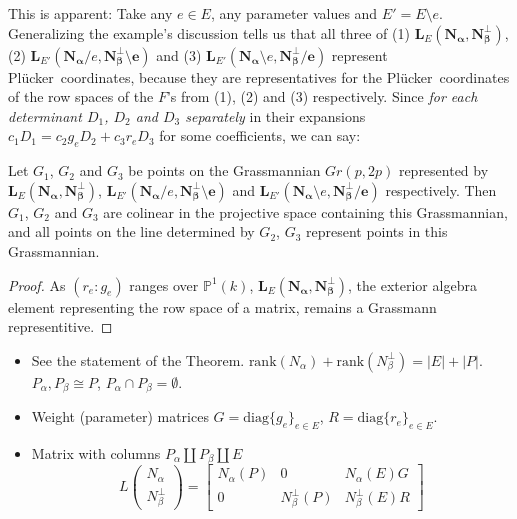 \documentclass[Unicode]{cedram-alco}
\newcommand{\ext}[1]{\ensuremath{\mathbf{#1}}}
\newcommand{\Plucker}{Pl\"{u}cker\ }
\newcommand{\Nal}{\ensuremath{N_{\alpha}}}
\newcommand{\NbePe}{\ensuremath{N_{\beta}^{\perp}}}
\newcommand{\dunion}{\coprod}
\begin{document}
This is apparent:  Take any $e\in E$, any parameter
values and $E'=E\setminus e$. Generalizing the example's discussion tells us that all three of
(1) $\ext{L}_E(\ext{N_\alpha},\ext{N_\beta^\perp})$,
(2) $\ext{L}_{E'}(\ext{N_\alpha}/e,\ext{N_\beta^\perp\setminus e})$ and
(3) $\ext{L}_{E'}(\ext{N_\alpha}\setminus e,\ext{N_\beta^\perp/e})$ represent
\Plucker coordinates, because they are representatives for the \Plucker coordinates
of the row spaces of the $F$'s from (1), (2) and (3) respectively.  Since \emph{for each determinant
$D_1$, $D_2$ and $D_3$ separately} in their expansions $c_1 D_1 = c_2 g_e D_2 + c_3 r_e D_3$ for
some coefficients, we can say:

\begin{prop}
Let $G_1$, $G_2$ and $G_3$ be points on the Grassmannian $Gr(p,2p)$ represented by
$\ext{L}_E(\ext{N_\alpha},\ext{N_\beta^\perp})$,
$\ext{L}_{E'}(\ext{N_\alpha}/e,\ext{N_\beta^\perp\setminus e})$ and
$\ext{L}_{E'}(\ext{N_\alpha}\setminus e,\ext{N_\beta^\perp/e})$ respectively. Then
$G_1$, $G_2$ and $G_3$ are colinear in the projective space containing this Grassmannian, and
all points on the line determined by $G_2$, $G_3$ represent points in this Grassmannian.
\end{prop}
\begin{proof}
  As $(r_e:g_e)$ ranges over $\mathbb{P}^1(k)$, $\ext{L}_E(\ext{N_\alpha},\ext{N_\beta^\perp})$, the
  exterior algebra element representing the row space of a matrix, remains a Grassmann representitive.
\end{proof}








      \begin{itemize}
  \item
    See the statement of the Theorem.
    $\text{rank}(\Nal)+\text{rank}(\NbePe)=|E|+|P|$.   %
    $P_{\alpha},P_{\beta}\cong P$, $P_{\alpha}\cap P_{\beta}=\emptyset$.
  \item
    Weight (parameter) matrices  %
    $G=\text{diag}\{g_e\}_{e\in E} $,
    $R=\text{diag}\{r_e\}_{e\in E} $.
  \item
    Matrix with columns $P_\alpha \dunion P_\beta \dunion E$
    \[
    L\left( \begin{array}{c} \Nal\\ \NbePe \end{array} \right)
    = \left[\begin{array}{c|c|c} \Nal(P)  &  0  &  \Nal(E)G \\  \hline
0  & \NbePe(P)  &  \NbePe(E)R \end{array}\right]
    \]
  \end{itemize}
\end{document}
